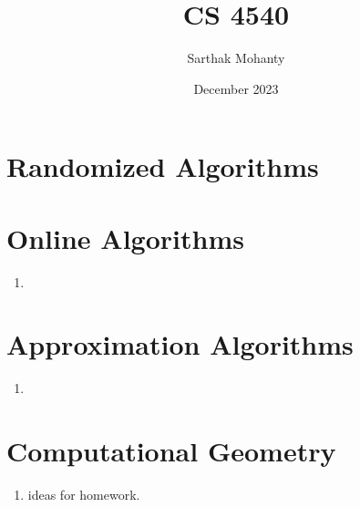 \documentclass{article}
\title{CS 4540}
\author{Sarthak Mohanty}
\date{December 2023}
\begin{document}
\maketitle

\section{Randomized Algorithms}

\section{Online Algorithms}
\begin{enumerate}
    \item 
\end{enumerate}

\section{Approximation Algorithms}
\begin{enumerate}
    \item 
\end{enumerate}


\section{Computational Geometry}
\begin{enumerate}
    \item ideas for homework. 
\end{enumerate}
\end{document}
